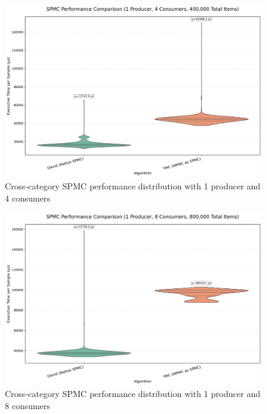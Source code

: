 \begin{figure}[H]
\centering
\caption{Cross-category SPMC performance distribution with 1 producer and 4 consumers}
\label{fig:cross-spmc-violin-4c}
\includegraphics[width=\textwidth]{images/results/best_in_spmc_performance_violin_1P4C.png}
\end{figure}

\begin{figure}[H]
\centering
\caption{Cross-category SPMC performance distribution with 1 producer and 8 consumers}
\label{fig:cross-spmc-violin-8c}
\includegraphics[width=\textwidth]{images/results/best_in_spmc_performance_violin_1P8C.png}
\end{figure}